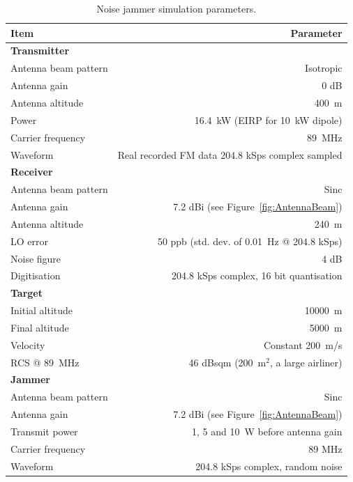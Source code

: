 \documentclass[conference]{IEEEtran}
\begin{document}
\begin{table}[ht!]\label{tab:SimulationParameters}
\caption{Noise jammer simulation parameters.}

	\centering
	
	\vspace{1cm}
	\begin{tabu} to \columnwidth { X r }
  		Item 								& Parameter\\
  		\hline
  		\textbf{Transmitter} 				& \\
  		Antenna beam pattern 				& Isotropic\\
  		Antenna gain 						& 0 dB\\
  		Antenna altitude 					& 400~m\\
  		Power 								& 16.4~kW (EIRP for 10~kW dipole)\\
  		Carrier frequency					& 89~MHz\\
  		Waveform							& Real recorded FM data 204.8 kSps complex sampled\\[3mm]
  		
  		\textbf{Receiver} 					& \\
  		Antenna beam pattern 				& Sinc\\
  		Antenna gain 						& 7.2 dBi (see Figure~\ref{fig:AntennaBeam})\\
  		Antenna altitude					& 240~m\\
  		LO error							& ~50 ppb (std. dev. of 0.01~Hz @ 204.8 kSps)\\
  		Noise figure						& 4 dB\\
  		Digitisation						& 204.8 kSps complex, 16 bit quantisation\\[3mm]

		\textbf{Target} 					& \\
		Initial altitude					& 10000~m\\
		Final altitude						& 5000~m\\
		Velocity							& Constant 200~m/s\\
		RCS @ 89~MHz						& 46 dBsqm (200~m$^2$, a large airliner)\\[3mm]
		
		\textbf{Jammer} 					& \\
		Antenna beam pattern				& Sinc\\
  		Antenna gain 						& 7.2 dBi (see Figure~\ref{fig:AntennaBeam})\\
  		Transmit power						& 1, 5 and 10~W before antenna gain\\
  		Carrier frequency					& 89 MHz\\
  		Waveform							& 204.8 kSps complex, random noise\\[3mm]
  		

\end{tabu}
\end{table}
\end{document}
